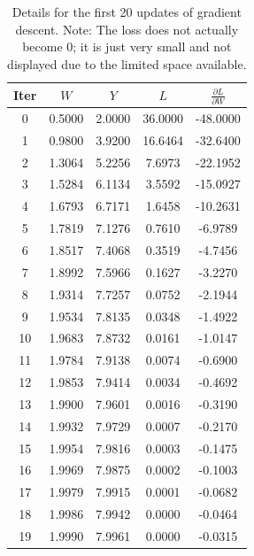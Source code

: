 \documentclass[12pt,a4paper]{article}
\begin{document}
\begin{table}[ht]
    \centering
    \begin{tabular}{|c|c|c|c|c|}
        \hline
        Iter & $W$ & $Y$ & $L$ & $\frac{\partial L}{\partial W}$ \\ \hline
         0 & 0.5000 & 2.0000 & 36.0000 & -48.0000 \\ \hline
         1 & 0.9800 & 3.9200 & 16.6464 & -32.6400 \\ \hline
         2 & 1.3064 & 5.2256 & 7.6973 & -22.1952 \\ \hline
         3 & 1.5284 & 6.1134 & 3.5592 & -15.0927 \\ \hline
         4 & 1.6793 & 6.7171 & 1.6458 & -10.2631 \\ \hline
         5 & 1.7819 & 7.1276 & 0.7610 & -6.9789 \\ \hline
         6 & 1.8517 & 7.4068 & 0.3519 & -4.7456 \\ \hline
         7 & 1.8992 & 7.5966 & 0.1627 & -3.2270 \\ \hline
         8 & 1.9314 & 7.7257 & 0.0752 & -2.1944 \\ \hline
         9 & 1.9534 & 7.8135 & 0.0348 & -1.4922 \\ \hline
        10 & 1.9683 & 7.8732 & 0.0161 & -1.0147 \\ \hline
        11 & 1.9784 & 7.9138 & 0.0074 & -0.6900 \\ \hline
        12 & 1.9853 & 7.9414 & 0.0034 & -0.4692 \\ \hline
        13 & 1.9900 & 7.9601 & 0.0016 & -0.3190 \\ \hline
        14 & 1.9932 & 7.9729 & 0.0007 & -0.2170 \\ \hline
        15 & 1.9954 & 7.9816 & 0.0003 & -0.1475 \\ \hline
        16 & 1.9969 & 7.9875 & 0.0002 & -0.1003 \\ \hline
        17 & 1.9979 & 7.9915 & 0.0001 & -0.0682 \\ \hline
        18 & 1.9986 & 7.9942 & 0.0000 & -0.0464 \\ \hline
        19 & 1.9990 & 7.9961 & 0.0000 & -0.0315 \\ \hline
    \end{tabular}
    \caption{Details for the first 20 updates of gradient descent. Note: The loss does not actually become 0; it is just very small and not displayed due to the limited space available.}
    \label{tab:gradient_descent_iterations}
\end{table}
\end{document}
